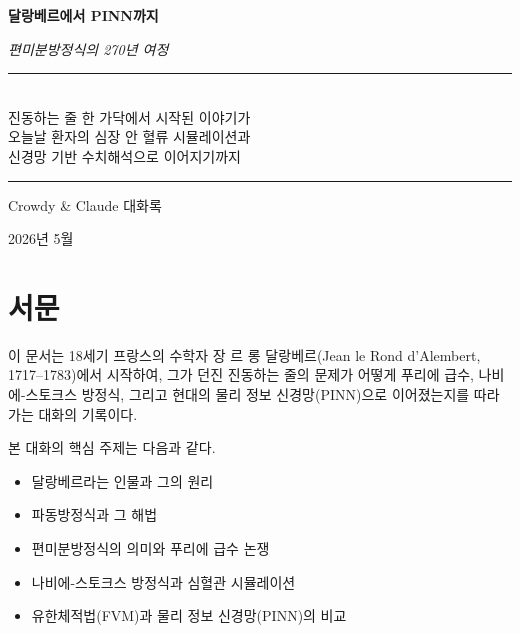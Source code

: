 \documentclass[11pt,a4paper]{article}
\begin{document}
\begin{titlepage}
\centering
\vspace*{3cm}

{\Huge\bfseries 달랑베르에서 PINN까지\par}
\vspace{0.5cm}
{\LARGE\itshape 편미분방정식의 270년 여정\par}
\vspace{2cm}

{\large\color{accentdark}
\rule{0.7\textwidth}{0.5pt}\\
\vspace{0.5cm}
진동하는 줄 한 가닥에서 시작된 이야기가\\
오늘날 환자의 심장 안 혈류 시뮬레이션과\\
신경망 기반 수치해석으로 이어지기까지\\
\vspace{0.5cm}
\rule{0.7\textwidth}{0.5pt}\par
}

\vfill

{\large Crowdy \& Claude 대화록\par}
\vspace{0.5cm}
{\normalsize 2026년 5월\par}

\end{titlepage}

\tableofcontents
\newpage

\section{서문}

이 문서는 18세기 프랑스의 수학자 장 르 롱 달랑베르(Jean le Rond d'Alembert, 1717--1783)에서 시작하여, 그가 던진 진동하는 줄의 문제가 어떻게 푸리에 급수, 나비에-스토크스 방정식, 그리고 현대의 물리 정보 신경망(PINN)으로 이어졌는지를 따라가는 대화의 기록이다.

본 대화의 핵심 주제는 다음과 같다.

\begin{itemize}[leftmargin=*, itemsep=2pt]
  \item 달랑베르라는 인물과 그의 원리
  \item 파동방정식과 그 해법
  \item 편미분방정식의 의미와 푸리에 급수 논쟁
  \item 나비에-스토크스 방정식과 심혈관 시뮬레이션
  \item 유한체적법(FVM)과 물리 정보 신경망(PINN)의 비교
\end{itemize}
\end{document}
